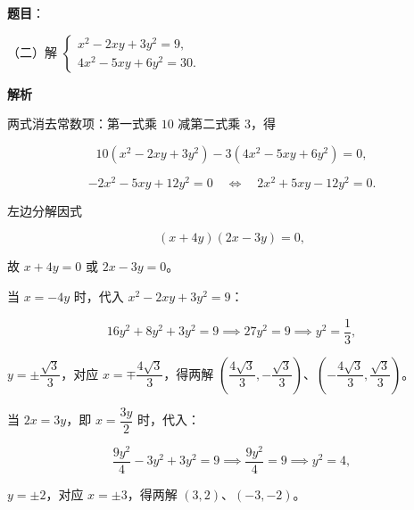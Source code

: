 \begin{answer}

\textbf{题目}：

（二）解 $\begin{cases}x^2-2xy+3y^2=9,\\4x^2-5xy+6y^2=30.\end{cases}$

\textbf{解析}

两式消去常数项：第一式乘 $10$ 减第二式乘 $3$，得

\nopagebreak[4]
\[
10(x^2-2xy+3y^2)-3(4x^2-5xy+6y^2)=0,
\]

\nopagebreak[4]
\[
-2x^2-5xy+12y^2=0\quad\Longleftrightarrow\quad 2x^2+5xy-12y^2=0.
\]

左边分解因式

\nopagebreak[4]
\[
(x+4y)(2x-3y)=0,
\]

故 $x+4y=0$ 或 $2x-3y=0$。

当 $x=-4y$ 时，代入 $x^2-2xy+3y^2=9$：

\nopagebreak[4]
\[
16y^2+8y^2+3y^2=9\implies 27y^2=9\implies y^2=\frac13,
\]

$y=\pm\dfrac{\sqrt3}{3}$，对应 $x=\mp\dfrac{4\sqrt3}{3}$，得两解 $\left(\dfrac{4\sqrt3}{3},-\dfrac{\sqrt3}{3}\right)$、$\left(-\dfrac{4\sqrt3}{3},\dfrac{\sqrt3}{3}\right)$。

当 $2x=3y$，即 $x=\dfrac{3y}{2}$ 时，代入：

\nopagebreak[4]
\[
\frac{9y^2}{4}-3y^2+3y^2=9\implies \frac{9y^2}{4}=9\implies y^2=4,
\]

$y=\pm2$，对应 $x=\pm3$，得两解 $(3,2)$、$(-3,-2)$。


\end{answer}
